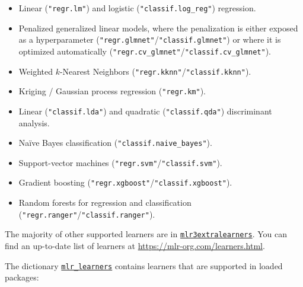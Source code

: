 \begin{itemize}
\tightlist
\item
  Linear (\texttt{"regr.lm"}) and logistic (\texttt{"classif.log\_reg"})
  regression.
\item
  Penalized generalized linear models, where the penalization is either
  exposed as a hyperparameter
  (\texttt{"regr.glmnet"}/\texttt{"classif.glmnet"})
  or where it is optimized automatically
  (\texttt{"regr.cv\_glmnet"}/\texttt{"classif.cv\_glmnet"}).
\item
  Weighted \(k\)-Nearest Neighbors
  (\texttt{"regr.kknn"}/\texttt{"classif.kknn"}).
\item
  Kriging / Gaussian process regression
  (\texttt{"regr.km"}).
\item
  Linear (\texttt{"classif.lda"}) and quadratic (\texttt{"classif.qda"})
  discriminant analysis.
\item
  Naïve Bayes classification (\texttt{"classif.naive\_bayes"}).
\item
  Support-vector machines
  (\texttt{"regr.svm"}/\texttt{"classif.svm"}).
\item
  Gradient boosting
  (\texttt{"regr.xgboost"}/\texttt{"classif.xgboost"}).
\item
  Random forests for regression and classification
  (\texttt{"regr.ranger"}/\texttt{"classif.ranger"}).
\end{itemize}

The majority of other supported learners are in
\href{https://mlr3extralearners.mlr-org.com}{\texttt{mlr3extralearners}}.
You can find an up-to-date list of learners at
\url{https://mlr-org.com/learners.html}.

The dictionary
\href{https://mlr3.mlr-org.com/reference/mlr_learners.html}{\texttt{mlr\_learners}}
contains learners that are supported in loaded packages:

\begin{Shaded}
\begin{Highlighting}[]
\OtherTok{=} 
\end{Highlighting}
\end{Shaded}

